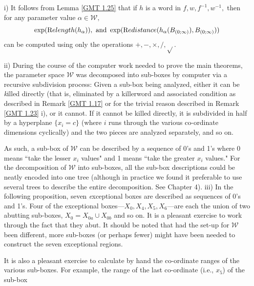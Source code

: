 \begin{remark}
\begin{remark}\label{GMT 1.26} i)  It follows from Lemma \ref{GMT 1.25} that if $h$ is a word in $f,w,f^{-1},w^{-1},$ then for any
parameter value $\alpha\in {\mathcal W},$
$$\exp({\textrm Relength}(h_\alpha)), \hbox{ and }
  \exp({\textrm Redistance}(h_\alpha(B_{(0;\infty)}), B_{(0;\infty)}))$$ can be computed using only the
operations $+, -, \times, /, \sqrt{}.$

 ii) During the course of the computer work needed to prove the main theorems, the parameter space
${\mathcal W}$ was decomposed into sub-boxes by computer via a recursive subdivision process:
Given a sub-box  being analyzed, either it can be {\textit killed directly} (that is, eliminated by a killerword and associated condition as described in
Remark \ref{GMT 1.17}
or for the trivial reason described in Remark \ref{GMT 1.23} i), or it cannot.  
If it cannot be killed directly, it is subdivided in half by a hyperplane
$\{x_i = c \}$ (where $i$ runs through the various co-ordinate dimensions
cyclically) and the two pieces are analyzed separately, and so on. 

As such, a sub-box of ${\mathcal W}$ can be described by a sequence of 0's and 1's where 0 means ``take the lesser $x_i$ values" and 1 means ``take the greater $x_i$ values."  
For the decomposition of ${\mathcal W}$ into sub-boxes, all the 
sub-box descriptions could be neatly encoded into one tree (although in practice we found it preferable to use several trees to describe the entire
decomposition.  See Chapter 4).
iii) In the following proposition, seven {\textit exceptional boxes} are described as sequences of 0's and 1's.  
Four of the exceptional boxes---$X_0, X_4, X_5, X_6$---are each the union of two abutting sub-boxes, $X_0 = X_{0a} \cup X_{0b}$ and so on.  It is a pleasant exercise to work through the fact that they abut.  
It should be noted that had the set-up for ${\mathcal W}$ been different, more sub-boxes (or perhaps fewer) might have been needed to construct the seven
exceptional regions. 

It is also a pleasant exercise to calculate by hand the co-ordinate ranges of the various sub-boxes.  For example, the range of the last co-ordinate (i.e., $x_5$) of the sub-box 
\eject


\end{remark}
\end{remark}
